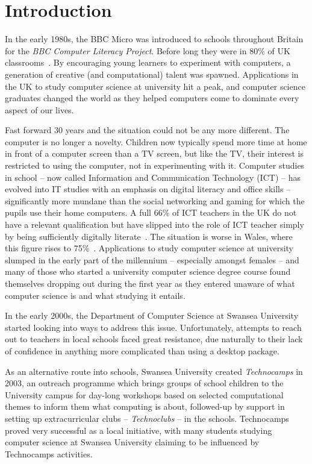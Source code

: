 \documentclass{sig-alternate}
\begin{document}

\section{Introduction}
In the early 1980s, the BBC Micro was introduced to schools throughout
Britain for the \emph{BBC Computer Literacy Project}.
Before long they were in 80\% of UK classrooms~\cite{vasko:1986}.
By encouraging young learners to experiment with computers, a generation
of creative (and computational) talent was spawned. Applications in
the UK to study computer science at university hit a peak, and
computer science graduates changed the world as they helped computers
come to dominate every aspect of our lives.

Fast forward 30 years and the situation could not be any more
different. The computer is no longer a novelty. Children now typically
spend more time at home in front of a computer screen than a TV screen, but
like the TV, their interest is restricted to using the computer, not
in experimenting with it. Computer studies in school -- now called
Information and Communication Technology (ICT) -- has evolved into IT
studies with an emphasis on digital literacy and office skills --
significantly more mundane than the social networking and gaming for
which the pupils use their home computers. A full 66\% of ICT teachers
in the UK do not have a relevant qualification but have slipped into
the role of ICT teacher simply by being sufficiently digitally
literate~\cite{RoyalSoc:2012}.
The situation is worse in Wales, where this figure rises to
75\%~\cite{GTCW:2008}.
Applications to
study computer science at university slumped in the early part of the
millennium -- especially amongst females -- and
many of those who started a university computer science degree course
found themselves dropping out during the first year as they entered
unaware of what computer science is and what studying it entails.

In the early 2000s, the Department of Computer Science at Swansea University
started looking into ways to address this issue.
Unfortunately, attempts to reach out to teachers in local schools
faced great resistance, due naturally to their lack of confidence
in anything more complicated than using a desktop package.

As an alternative route into schools, Swansea University created
\emph{Technocamps} in 2003, an outreach programme which brings groups
of school children to the University campus for day-long workshops based on
selected computational themes to inform them what computing is about,
followed-up by support in setting up
extracurricular clubs -- \emph{Technoclubs} -- in the schools.
Technocamps proved very successful as a local initiative, with many
students studying computer science at Swansea University claiming to be
influenced by Technocamps activities.
\end{document}
